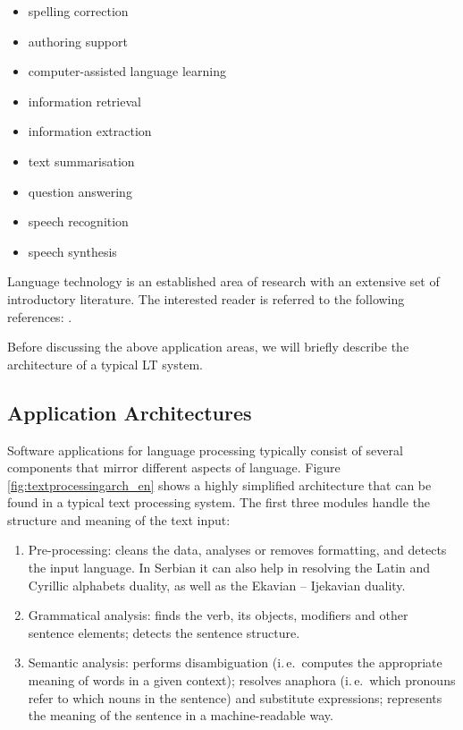 {\begin{multicols}{2}
\begin{itemize}
\item spelling correction
\item authoring support
\item computer-assisted language learning
\item information retrieval 
\item information extraction
\item text summarisation
\item question answering
\item speech recognition 
\item speech synthesis 
\end{itemize}

Language technology is an established area of research with an extensive set of introductory literature. The interested reader is referred to the following references:  \cite{jurafsky-martin01, manning-schuetze1, lt-survey1}.

Before discussing the above application areas, we will briefly describe the architecture of a typical LT system.

 \subsection {Application Architectures}
   
Software applications for language processing typically consist of several components that mirror different aspects of language. Figure \ref{fig:textprocessingarch_en} shows a highly simplified architecture that can be found in a typical text processing system. The first three modules handle the structure and meaning of the text input:

\begin{enumerate}
 \item Pre-processing: cleans the data, analyses or removes formatting, and detects the input language. In Serbian it can also help in resolving the Latin and Cyrillic alphabets duality, as well as the Ekavian – Ijekavian duality.
\item Grammatical analysis: finds the verb, its objects, modifiers and other sentence elements; detects the sentence structure.
\item Semantic analysis: performs disambiguation (i.\,e.~computes the appropriate meaning of words in a given context); resolves anaphora (i.\,e.~which pronouns refer to which nouns in the sentence) and substitute expressions; represents the meaning of the sentence in a machine-readable way.
\end{enumerate}


\end{multicols}}
